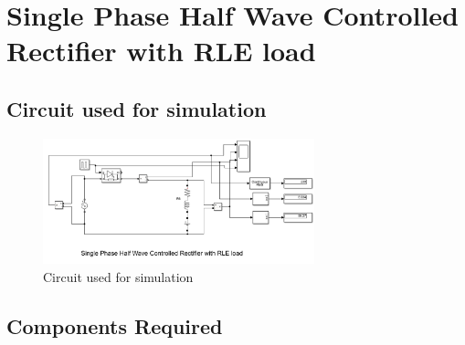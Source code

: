 \section{Single Phase Half Wave Controlled Rectifier with RLE load}

\subsection{Circuit used for simulation}

\begin{figure}[h]
    \centering
    \includegraphics[width=0.7\textwidth]{images/experiment-1/circuit-diagram-simulation-07.png}
    \caption{Circuit used for simulation}
    \label{Fig_simulation_circuit_single-phase-half-wave-controlled-rectifier-with-RLE-load}
\end{figure}

\subsection{Components Required}

